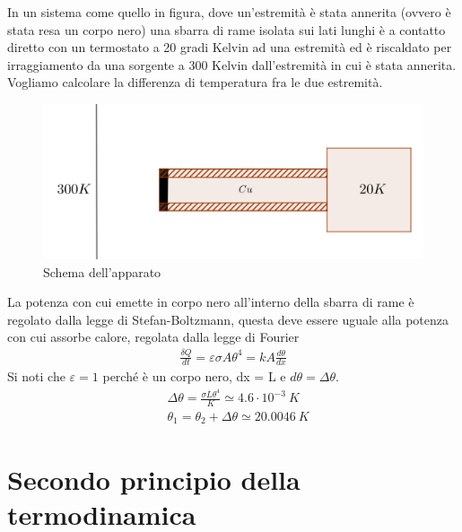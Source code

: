 \documentclass[
10pt, %
a4paper, %
oneside, %
headinclude,footinclude, %
BCOR5mm, %
]{scrartcl}
\begin{document}
\begin{exercise}
	In un sistema come quello in figura, dove un'estremità è stata annerita (ovvero è stata resa un corpo nero) una sbarra di rame isolata sui lati lunghi è a contatto diretto con un termostato a 20 gradi Kelvin ad una estremità ed è riscaldato per irraggiamento da una sorgente a 300 Kelvin dall'estremità in cui è stata annerita. Vogliamo calcolare la differenza di temperatura fra le due estremità.
	\begin{figure}[h!]
		\centering
		\includegraphics[width=0.6\linewidth]{../images/esercizio_scambio_calore}
		\caption{Schema dell'apparato}
		\label{fig:esercizioscambiocalore}
	\end{figure}
	\FloatBarrier
	La potenza con cui emette in corpo nero all'interno della sbarra di rame è regolato dalla legge di Stefan-Boltzmann, questa deve essere uguale alla potenza con cui assorbe calore, regolata dalla legge di Fourier 
	\begin{align*}
		\frac{\delta Q}{dt} = \varepsilon \sigma A \theta^4 = k A \frac{d\theta}{dx}
	\end{align*}
	Si noti che $\varepsilon = 1$ perché è un corpo nero, dx = L e $d\theta = \Delta\theta$.
	\begin{align*}
		&\Delta\theta = \frac{\sigma L \theta^4}{K} \simeq 4.6\cdot 10^{-3}\ K\\
		&\theta_1 = \theta_2 + \Delta\theta \simeq 20.0046\ K
	\end{align*}
	
\end{exercise}
\newpage
\section{Secondo principio della termodinamica}
\end{document}
